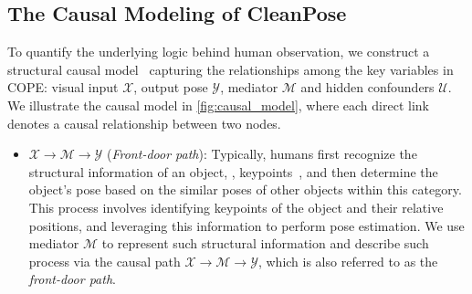 \subsection{The Causal Modeling of CleanPose}
\label{sec:casual_modeling}
To quantify the underlying logic behind human observation, we construct a structural causal model~\cite{pearl2009causality,pearl2016causal} capturing the relationships among the key variables in COPE: visual input $\mathcal{X}$, output pose $\mathcal{Y}$, mediator $\mathcal{M}$ and hidden confounders $\mathcal{U}$.
We illustrate the causal model in \cref{fig:causal_model}, where each direct link denotes a causal relationship between two nodes.
\begin{itemize}
    \item $\mathcal{X}\rightarrow\mathcal{M}\rightarrow\mathcal{Y}$ (\emph{Front-door path}): Typically, humans first recognize the structural information of an object, \ie, keypoints~\cite{lin2024instance,zheng2023hs}, and then determine the object's pose based on the similar poses of other objects within this category. This process involves identifying keypoints of the object and their relative positions, and leveraging this information to perform pose estimation. We use mediator $\mathcal{M}$ to represent such structural information and describe such process via the causal path $\mathcal{X} \rightarrow \mathcal{M} \rightarrow \mathcal{Y}$, which is  also referred to as the \emph{front-door path}. 

\end{itemize}
